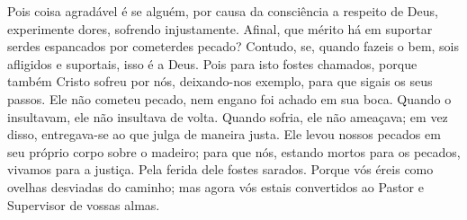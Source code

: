 {  Pois coisa agradável é se alguém, por causa da consciência a respeito de Deus, experimente dores, sofrendo injustamente.
  Afinal, que mérito há em suportar serdes espancados por cometerdes pecado? Contudo, se, quando fazeis o bem, sois afligidos e suportais, isso é a Deus.
  Pois para isto fostes chamados, porque também Cristo sofreu por nós, deixando-nos exemplo, para que sigais os seus passos.
  Ele não cometeu pecado, nem engano foi achado em sua boca.
  Quando o insultavam, ele não insultava de volta. Quando sofria, ele não ameaçava; em vez disso, entregava-se ao que julga de maneira justa.
  Ele levou nossos pecados em seu próprio corpo sobre o madeiro; para que nós, estando mortos para os pecados, vivamos para a justiça. Pela ferida dele fostes sarados.
  Porque vós éreis como ovelhas desviadas do caminho; mas agora vós estais convertidos ao Pastor e Supervisor de vossas almas.
\par }

